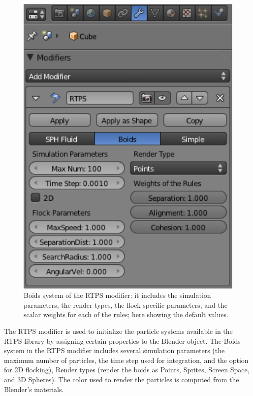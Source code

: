 \begin{figure}[htbp]
\begin{center}
\includegraphics[scale=0.8]{figures/modifier.pdf}
\caption{Boids system of the RTPS modifier: it includes the simulation parameters, the render types, the flock specific parameters, and the scalar weights for each of the rules; here showing the default values.}
\label{ui}
\end{center}
\end{figure}

The RTPS modifier is used to initialize the particle systems available in the RTPS library by assigning certain properties to the Blender object. The Boids system in the RTPS modifier includes several simulation parameters (the maximum number of particles, the time step used for integration, and the option for 2D flocking), Render types (render the boids as Points, Sprites, Screen Space, and 3D Spheres). The color used to render the particles is computed  from the Blender's materials.

